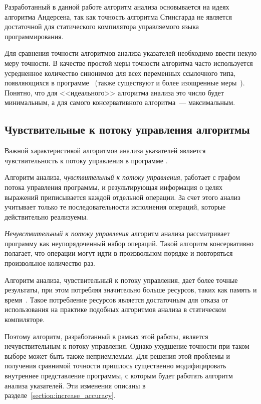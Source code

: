 \documentclass[14pt,titlepage,draft]{extarticle}
\begin{document}
    Разработанный в данной работе алгоритм анализа основывается на идеях
    алгоритма Андерсена, так как точность алгоритма Стинсгарда не является
    достаточной для статического компилятора управляемого языка
    программирования.

    Для сравнения точности алгоритмов анализа указателей необходимо ввести
    некую меру точности. В качестве простой меры точности алгоритма часто
    используется усредненное количество синонимов для всех переменных
    ссылочного типа, появляющихся в
    программе~\cite[раздел~3.2]{hind_pointer_analysis_not_solved_yet}
    (также существуют и более изощренные
    меры~\cite{hind_pointer_analysis_not_solved_yet,diwan_tbaa}).
    Понятно, что для <<идеального>> алгоритма анализа это число будет
    минимальным, а для самого консервативного алгоритма~--- максимальным.

  \subsection{Чувствительные к потоку управления алгоритмы}
    \label{section:choosing_flow_insensitive}

    Важной характеристикой алгоритмов анализа указателей является
    чувствительность к потоку управления в программе
    .

    Алгоритм анализа, \emph{чувствительный к потоку управления}, работает с
    графом потока управления программы, и результирующая информация о целях
    выражений приписывается каждой отдельной операции. За счет этого анализ
    учитывает только те последовательности исполнения операций, которые
    действительно реализуемы.

    \emph{Нечувствительный к потоку управления} алгоритм анализа рассматривает
    программу как неупорядоченный набор операций. Такой алгоритм
    консервативно полагает, что операции могут идти в произвольном порядке и
    повторяться произвольное количество раз.

    Алгоритм анализа, чувствительный к потоку управления, дает более точные
    результаты, при этом потребляя значительно больше ресурсов, таких как
    память и время~\cite[раздел.~4.4]{hind_pointer_analysis_not_solved_yet}.
    Такое потребление ресурсов является достаточным для отказа от
    использования на практике подобных алгоритмов анализа в статическом
    компиляторе.

    Поэтому алгоритм, разработанный в рамках этой работы, является
    нечувствительным к потоку управления. Однако ухудшение точности при таком
    выборе может быть также неприемлемым.
    Для решения этой проблемы и получения сравнимой точности пришлось
    существенно модифицировать внутреннее представление программы, с которым
    будет работать алгоритм анализа указателей. Эти изменения описаны в
    разделе~\ref{section:increase_accuracy}.
\end{document}
